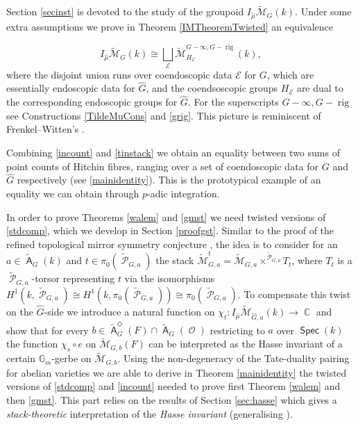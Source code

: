 \documentclass{article}
\DeclareMathOperator{\rig}{rig}
\DeclareMathOperator{\A}{\mathsf{A}}
\DeclareMathOperator{\Cb}{\mathbb{C}}
\newcommand{\Gb}{\mathbb{G}}
\newcommand{\Mc}{\mathcal{M}}
\DeclareMathOperator{\Pc}{\mathcal{P}}
\DeclareMathOperator{\Spec}{\mathsf{Spec}}
\DeclareMathOperator{\Oo}{\mathcal{O}}
\newcommand{\CE}{{\mathcal E}}
\newcommand{\FA}{\A}
\theoremstyle{definition}
\theoremstyle{plain}
\begin{document}
Section \ref{secinst} is devoted to the study of the groupoid $I_{\widehat{\mu}}\widetilde{\Mc}_{G}(k)$. Under some extra assumptions we prove in Theorem \ref{IMTheoremTwisted} an equivalence  

\begin{equation}\label{tinstack}  I_{\hat\mu}\widetilde{\mathcal{M}}_G(k) \cong \bigsqcup_{\CE} \widetilde{\mathcal{M}}^{G-\infty,G-\rig}_{H_\CE}(k), \end{equation}
where the disjoint union runs over coendoscopic data $\CE$ for $G$, which are essentially endoscopic data for $\widehat{G}$, and the coendsoscopic groups $H_\CE$ are dual to the corresponding endoscopic groups for $\widehat{G}$. For the superscripts $G-\infty,G-\rig$ see Constructions \ref{TildeMuCons} and \ref{grig}. This picture is reminiscent of Frenkel--Witten's \cite{MR2417848}.

Combining \eqref{incount} and \eqref{tinstack} we obtain an equality between two sums of point counts of Hitchin fibres, ranging over a set of coendoscopic data for $G$ and $\widehat{G}$ respectively (see \ref{mainidentity}). This is the prototypical example of an equality we can obtain through $p$-adic integration.

In order to prove Theorems  \ref{walem} and \ref{gmst} we need twisted versions of \eqref{stdcomp}, which we develop in Section \ref{proofgst}. Similar to the proof of the refined topological mirror symmetry conjecture \cite[Theorem 5.21]{gwz}, the idea is to consider for an $a \in \widetilde{\FA}_G(k)$ and $t \in \pi_0(\widetilde{\Pc}_{G,a})$ the stack $\widetilde{\Mc}_{G,a}^t=\widetilde{\Mc}_{G,a} \times^{\widetilde{\Pc}_{G,a}} T_t $, where $T_t$ is a $\widetilde{\Pc}_{G,a}$-torsor representing $t$ via the isomorphisms $H^1(k,\widetilde{\Pc}_{G,a}) \cong H^1(k,\pi_0(\widetilde{\Pc}_{G,a})) \cong \pi_0(\widetilde{\Pc}_{G,a})$. To compensate this twist on the $\widehat{G}$-side we introduce a natural function on $\chi_t:I_{\widehat{\mu}}\widetilde{\Mc}_{\widehat{G},a}(k) \to \Cb$ and show that for every $b \in \widetilde{\FA}^\Diamond_G(F) \cap \widetilde{\FA}_G(\Oo)$ restricting to $a$ over $\Spec(k)$ the function $\chi_s \circ e$ on $\widetilde{\Mc}_{G,b}(F)$ can be interpreted as the Hasse invariant of a certain $\Gb_m$-gerbe on $\widetilde{\Mc}_{G,b}$. Using the non-degeneracy of the Tate-duality pairing for abelian varieties we are able to derive in Theorem \ref{mainidentity} the twisted versions of \eqref{stdcomp} and \eqref{incount} needed to prove first Theorem \ref{walem} and then \ref{gmst}. This part relies on the results of Section \ref{sec:hasse} which gives a \emph{stack-theoretic} interpretation of the \emph{Hasse invariant} (generalising \cite[3.3]{gwz}).
\end{document}
